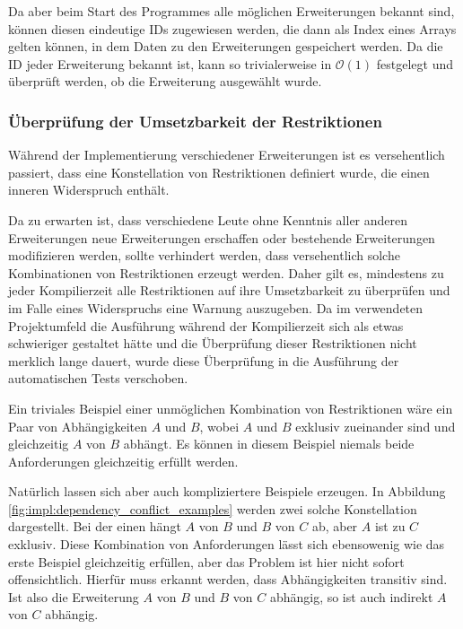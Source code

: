 Da aber beim Start des Programmes alle möglichen Erweiterungen bekannt sind, können diesen eindeutige IDs zugewiesen werden, die dann als Index eines Arrays gelten können, in dem Daten zu den Erweiterungen gespeichert werden. Da die ID jeder Erweiterung bekannt ist, kann so trivialerweise in $\mathcal{O}(1)$ festgelegt und überprüft werden, ob die Erweiterung ausgewählt wurde.

\subsubsection{Überprüfung der Umsetzbarkeit der Restriktionen}
Während  der Implementierung verschiedener Erweiterungen ist es versehentlich passiert, dass eine Konstellation von Restriktionen definiert wurde, die einen inneren Widerspruch enthält.

Da zu erwarten ist, dass verschiedene Leute ohne Kenntnis aller anderen Erweiterungen neue Erweiterungen erschaffen oder bestehende Erweiterungen modifizieren werden, sollte verhindert werden, dass versehentlich solche Kombinationen von Restriktionen erzeugt werden. Daher gilt es, mindestens zu jeder Kompilierzeit alle Restriktionen auf ihre Umsetzbarkeit zu überprüfen und im Falle eines Widerspruchs eine Warnung auszugeben. Da im verwendeten Projektumfeld die Ausführung während der Kompilierzeit sich als etwas schwieriger gestaltet hätte und die Überprüfung dieser Restriktionen nicht merklich lange dauert, wurde diese Überprüfung in die Ausführung der automatischen Tests verschoben.

Ein triviales Beispiel einer unmöglichen Kombination von Restriktionen wäre ein Paar von Abhängigkeiten $A$ und $B$, wobei $A$ und $B$ exklusiv zueinander sind und gleichzeitig $A$ von $B$ abhängt. Es können in diesem Beispiel niemals beide Anforderungen gleichzeitig erfüllt werden.

Natürlich lassen sich aber auch kompliziertere Beispiele erzeugen. In Abbildung \ref{fig:impl:dependency_conflict_examples} werden zwei solche Konstellation dargestellt. Bei der einen hängt $A$ von $B$ und $B$ von $C$ ab, aber $A$ ist zu $C$ exklusiv. Diese Kombination von Anforderungen lässt sich ebensowenig wie das erste Beispiel gleichzeitig erfüllen, aber das Problem ist hier nicht sofort offensichtlich. Hierfür muss erkannt werden, dass Abhängigkeiten transitiv sind. Ist also die Erweiterung $A$ von $B$ und $B$ von $C$ abhängig, so ist auch indirekt $A$ von $C$ abhängig.

